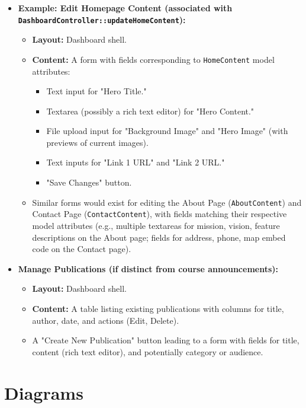 \documentclass[12pt,a4paper]{article}
\begin{document}
\begin{itemize}
    \item \textbf{Example: Edit Homepage Content (associated with \texttt{DashboardController::updateHomeContent}):}
    \begin{itemize}
        \item \textbf{Layout:} Dashboard shell.
        \item \textbf{Content:} A form with fields corresponding to \texttt{HomeContent} model attributes:
        \begin{itemize}
            \item Text input for "Hero Title."
            \item Textarea (possibly a rich text editor) for "Hero Content."
            \item File upload input for "Background Image" and "Hero Image" (with previews of current images).
            \item Text inputs for "Link 1 URL" and "Link 2 URL."
            \item "Save Changes" button.
        \end{itemize}
        \item Similar forms would exist for editing the About Page (\texttt{AboutContent}) and Contact Page (\texttt{ContactContent}), with fields matching their respective model attributes (e.g., multiple textareas for mission, vision, feature descriptions on the About page; fields for address, phone, map embed code on the Contact page).
    \end{itemize}
    \item \textbf{Manage Publications (if distinct from course announcements):}
    \begin{itemize}
        \item \textbf{Layout:} Dashboard shell.
        \item \textbf{Content:} A table listing existing publications with columns for title, author, date, and actions (Edit, Delete).
        \item A "Create New Publication" button leading to a form with fields for title, content (rich text editor), and potentially category or audience.
    \end{itemize}
\end{itemize}

\section{Diagrams}
\end{document}

